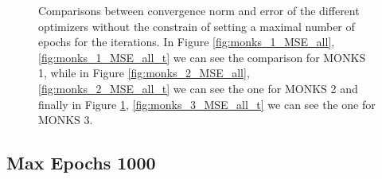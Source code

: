\begin{appendices}
\begin{figure}[b!]{}
\begin{subfigure}{0.45\textwidth}
{                        }
                        \caption{}
                        \label{fig:monks_3_MSE_all}
                    \end{subfigure}
                    \caption{Comparisons between convergence norm and error of the different optimizers without the constrain of setting a maximal
                    number of epochs for the iterations. In Figure \ref{fig:monks_1_MSE_all}, \ref{fig:monks_1_MSE_all_t} we can see the
                    comparison for MONKS 1, while in Figure \ref{fig:monks_2_MSE_all}, \ref{fig:monks_2_MSE_all_t} we can see the one for
                    MONKS 2 and finally in Figure \ref{fig:monks_3_MSE_all},  \ref{fig:monks_3_MSE_all_t} we can see the one for MONKS 3.}
                    \label{fig:monks_all}
                \end{figure}
       
            \clearpage
            \subsection{Max Epochs 1000}


\end{appendices}
